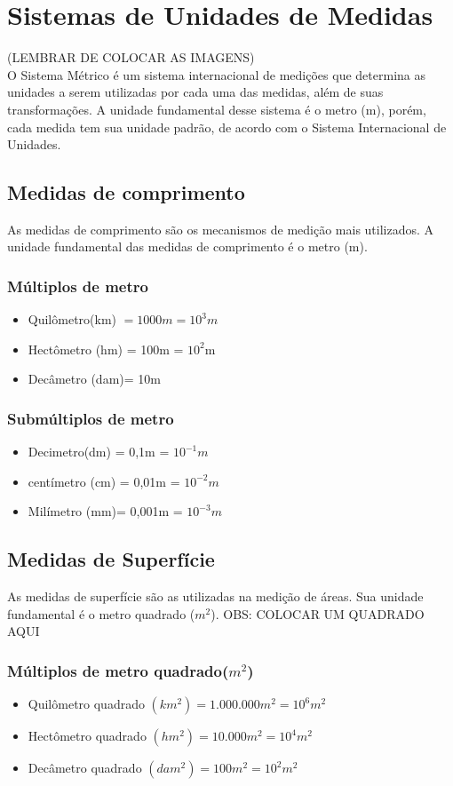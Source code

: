 \documentclass[11pt,fleqn]{book} %
\begin{document}
\chapter{Sistemas de Unidades de Medidas}
(LEMBRAR DE COLOCAR AS IMAGENS)
\\O Sistema Métrico é um sistema internacional de medições que determina as unidades a serem utilizadas por cada uma das medidas, além de suas transformações. A unidade fundamental desse sistema é o metro (m), porém, cada medida tem sua unidade padrão, de acordo com o Sistema Internacional de Unidades. 

\section{Medidas de comprimento}
As medidas de comprimento são os mecanismos de medição mais utilizados. A unidade fundamental das medidas de comprimento é o metro (m). 
\subsection{Múltiplos de metro}
\begin{itemize}
	\item Quilômetro(km) $= 1000m = 10^3m$
	\item Hectômetro (hm)  = 100m = $10^2$m
	\item Decâmetro (dam)= 10m 
	
\end{itemize}

\subsection{Submúltiplos de metro}
\begin{itemize}
	\item Decimetro(dm) = 0,1m = $10^{-1}m$
	\item centímetro (cm) = 0,01m = $10^{-2}m$
	\item Milímetro (mm)= 0,001m = $10^{-3}m$
\end{itemize}
\section{Medidas de Superfície}
As medidas de superfície são as utilizadas na medição de
áreas. Sua unidade fundamental é o metro quadrado ($m^2$).
OBS: COLOCAR UM QUADRADO AQUI
\subsection{Múltiplos de metro quadrado($m^2$)}
\begin{itemize}
	\item Quilômetro quadrado $(km^2) = 1.000.000 m^2 = 10^6 m^2$
	\item Hectômetro quadrado $(hm^2) = 10.000 m^2 = 10^4 m^2$
	\item Decâmetro quadrado $(dam^2) = 100 m^2 = 10^2 m^2$
	
\end{itemize}
\end{document}
